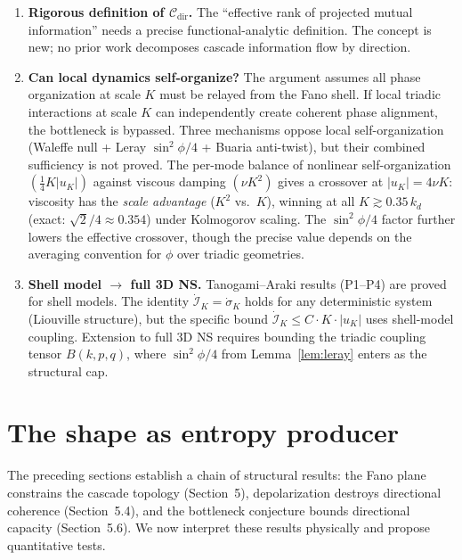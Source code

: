 \documentclass[11pt]{article}
\theoremstyle{definition}
\theoremstyle{remark}
\begin{document}
\begin{enumerate}
  \item \textbf{Rigorous definition of $\mathcal{C}_{\mathrm{dir}}$.}
    The ``effective rank of projected mutual information'' needs a
    precise functional-analytic definition. The concept is new; no
    prior work decomposes cascade information flow by direction.

  \item \textbf{Can local dynamics self-organize?} The argument assumes
    all phase organization at scale $K$ must be relayed from the Fano
    shell. If local triadic interactions at scale $K$ can independently
    create coherent phase alignment, the bottleneck is bypassed.
    Three mechanisms oppose local self-organization
    (Waleffe null + Leray $\sin^2\phi/4$ + Buaria anti-twist), but
    their combined sufficiency is not proved. The per-mode balance of
    nonlinear self-organization $(\tfrac{1}{4}K|u_K|)$ against viscous
    damping $(\nu K^2)$ gives a crossover at $|u_K| = 4\nu K$: viscosity
    has the \emph{scale advantage} ($K^2$ vs.\ $K$), winning at all
    $K \gtrsim 0.35\,k_d$ (exact: $\sqrt{2}/4 \approx 0.354$) under
    Kolmogorov scaling. The $\sin^2\phi/4$ factor further lowers the
    effective crossover, though the precise value depends on the
    averaging convention for $\phi$ over triadic geometries.

  \item \textbf{Shell model $\to$ full 3D NS.} Tanogami--Araki results
    (\textsc{P1}--\textsc{P4}) are proved for shell models. The
    identity $\dot{\mathcal{I}}_K = \dot{\sigma}_K$ holds for any
    deterministic system (Liouville structure), but the specific bound
    $\dot{\mathcal{I}}_K \leq C \cdot K \cdot |u_K|$ uses shell-model
    coupling. Extension to full 3D NS requires bounding the triadic
    coupling tensor $B(k,p,q)$, where $\sin^2\phi/4$ from
    Lemma~\ref{lem:leray} enters as the structural cap.
\end{enumerate}

\section{The shape as entropy producer}

The preceding sections establish a chain of structural results:
the Fano plane constrains the cascade topology (Section~5),
depolarization destroys directional coherence (Section~5.4),
and the bottleneck conjecture bounds directional capacity
(Section~5.6). We now interpret these results physically
and propose quantitative tests.
\end{document}
